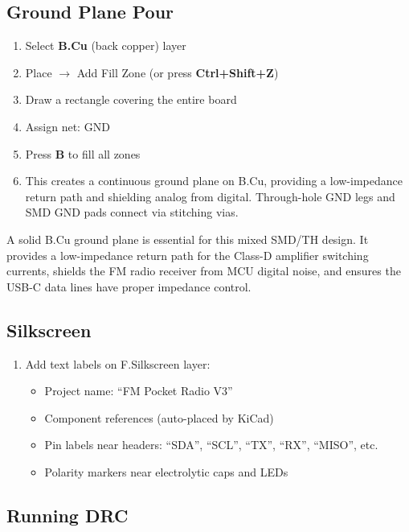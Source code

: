 \documentclass[a4paper,11pt]{article}
\renewcommand*{\,}{ }%
\begin{document}
\subsection{Ground Plane Pour}

\begin{enumerate}
    \item Select \textbf{B.Cu} (back copper) layer
    \item Place $\rightarrow$ Add Fill Zone (or press \textbf{Ctrl+Shift+Z})
    \item Draw a rectangle covering the entire board
    \item Assign net: GND
    \item Press \textbf{B} to fill all zones
    \item This creates a continuous ground plane on B.Cu, providing a low-impedance return path and shielding analog from digital. Through-hole GND legs and SMD GND pads connect via stitching vias.
\end{enumerate}

\begin{infobox}
A solid B.Cu ground plane is essential for this mixed SMD/TH design. It provides a low-impedance return path for the Class-D amplifier switching currents, shields the FM radio receiver from MCU digital noise, and ensures the USB-C data lines have proper impedance control.
\end{infobox}

\subsection{Silkscreen}

\begin{enumerate}
    \item Add text labels on F.Silkscreen layer:
    \begin{itemize}[noitemsep]
        \item Project name: ``FM Pocket Radio V3''
        \item Component references (auto-placed by KiCad)
        \item Pin labels near headers: ``SDA'', ``SCL'', ``TX'', ``RX'', ``MISO'', etc.
        \item Polarity markers near electrolytic caps and LEDs
    \end{itemize}
\end{enumerate}

\subsection{Running DRC}
\end{document}
